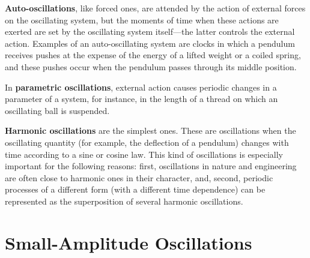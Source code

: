\textbf{Auto-oscillations}, like forced ones, are attended by the action of external forces on the oscillating system, but the moments of time when these actions are exerted are set by the oscillating system itself---the latter controls the external action. Examples of an auto-oscillating system are clocks in which a pendulum receives pushes at the expense of the energy of a lifted weight or a coiled spring, and these pushes occur when the pendulum passes through its middle position.

In \textbf{parametric oscillations}, external action causes periodic changes in a parameter of a system, for instance, in the length of a thread on which an oscillating ball is suspended.

\textbf{Harmonic oscillations} are the simplest ones. These are oscillations when the oscillating quantity (for example, the deflection of a pendulum) changes with time according to a sine or cosine law. This kind of oscillations is especially important for the following reasons: first, oscillations in nature and engineering are often close to harmonic ones in their character, and, second, periodic processes of a different form (with a different time dependence) can be represented as the superposition of several harmonic oscillations.

\section{Small-Amplitude Oscillations}\label{sec:7_2}

